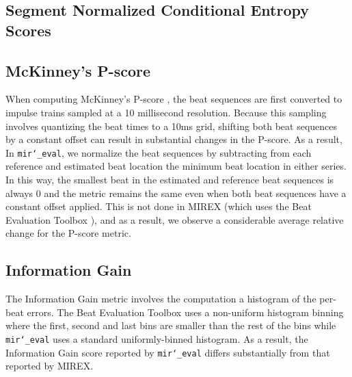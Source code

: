 \documentclass{article}
\def\mireval{\texttt{mir\char`_eval}}
\begin{document}


\subsection{Segment Normalized Conditional Entropy Scores}



\subsection{McKinney's P-score}

When computing McKinney's P-score \cite{davies2009evaluation}, the beat sequences are first converted to impulse trains sampled at a 10 millisecond resolution.
Because this sampling involves quantizing the beat times to a 10ms grid, shifting both beat sequences by a constant offset can result in substantial changes in the P-score.
As a result, In \mireval{}, we normalize the beat sequences by subtracting from each reference and estimated beat location the minimum beat location in either series.
In this way, the smallest beat in the estimated and reference beat sequences is always $0$ and the metric remains the same even when both beat sequences have a constant offset applied.
This is not done in MIREX (which uses the Beat Evaluation Toolbox \cite{davies2009evaluation}), and as a result, we observe a considerable average relative change for the P-score metric.

\subsection{Information Gain}

The Information Gain metric \cite{davies2009evaluation} involves the computation a histogram of the per-beat errors.
The Beat Evaluation Toolbox uses a non-uniform histogram binning where the first, second and last bins are smaller than the rest of the bins while \mireval{} uses a standard uniformly-binned histogram.
As a result, the Information Gain score reported by \mireval{} differs substantially from that reported by MIREX.
\end{document}
